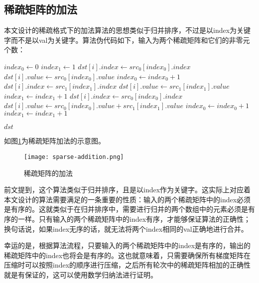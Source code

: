 \subsection{稀疏矩阵的加法}
本文设计的稀疏格式下的加法算法的思想类似于归并排序，不过是以index为关键字而不是以val为关键字。算法伪代码如下，输入为两个稀疏矩阵和它们的非零元个数：
\makeatletter
\def\BState{\State\hskip-\ALG@thistlm}
\makeatother
\begin{algorithm}
\begin{algorithmic}[1]
\State $index_0 \gets 0$
\State $index_1 \gets 1$
\State $dst[i].index \gets src_0[index_0].index$
\State $dst[i].value \gets src_0[index_0].value$
\State $index_0 \gets index_0 + 1$
\State $dst[i].index \gets src_1[index_1].index$
\State $dst[i].value \gets src_1[index_1].value$
\State $index_1 \gets index_1 + 1$
\State $dst[i].index \gets src_0[index_0].index$
\State $dst[i].value \gets src_0[index_0].value + src_1[index_1].value$
\State $index_0 \gets index_0 + 1$
\State $index_1 \gets index_1 + 1$

\EndIf
\EndFor
\State \Return $dst$
\EndProcedure
\end{algorithmic}
\end{algorithm}


如图\ref{fig:sparse-addition}为稀疏矩阵加法的示意图。

\begin{figure}[ht] %
  \centering
  \texttt{[image: sparse-addition.png]}
  \caption{稀疏矩阵的加法}
  \label{fig:sparse-addition}
\end{figure}

前文提到，这个算法类似于归并排序，且是以index作为关键字。这实际上对应着本文设计的算法需要满足的一条重要的性质：输入的两个稀疏矩阵中的index必须是有序的。这就类似于在归并排序中，需要进行归并的两个数组中的元素必须是有序的一样。只有输入的两个稀疏矩阵中的index有序，才能够保证算法的正确性；换句话说，如果index无序的话，就无法将两个index相同的val正确地进行合并。

幸运的是，根据算法流程，只要输入的两个稀疏矩阵中的index是有序的，输出的稀疏矩阵中的index也将会是有序的。这也就意味着，只需要确保所有梯度矩阵在压缩时可以按照index的顺序进行压缩，之后所有轮次中的稀疏矩阵相加的正确性就是有保证的，这可以使用数学归纳法进行证明。


